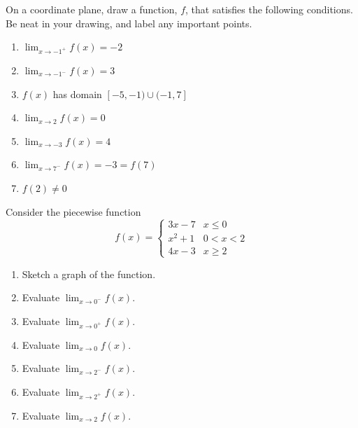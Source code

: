 \documentclass{ximera}
\begin{document}
\begin{exercise}
    On a coordinate plane, draw a function, $f$, that satisfies the following conditions.  Be neat in your drawing, and label any important points.
        \begin{enumerate}
            \item $\displaystyle\lim_{x\rightarrow -1^+}f(x)=-2$
            \item $\displaystyle\lim_{x\rightarrow -1^-} f(x)=3$
            \item $f(x)$ has domain $[-5, -1)\cup(-1,7] $
            \item $\displaystyle\lim_{x\rightarrow 2}f(x)=0$
            \item $\displaystyle\lim_{x\rightarrow -3}f(x)=4$
            \item $\displaystyle\lim_{x\rightarrow 7^-} f(x)=-3=f(7)$
            \item $f(2)\neq 0$
        \end{enumerate}
\end{exercise}

\begin{exercise}   
  Consider the piecewise function 
  \[f(x)=
  \begin{cases}
    3x-7 & x\leq 0\\
    x^2+1 & 0<x<2\\
    4x-3 & x\geq 2
  \end{cases}\]
  \begin{enumerate}
    \item Sketch a graph of the function.
    \item Evaluate $\lim_{x\rightarrow 0^-}f(x)$.
    \item Evaluate $\lim_{x\rightarrow 0^+}f(x)$.
    \item Evaluate $\lim_{x\rightarrow 0}f(x)$.
    \item Evaluate $\lim_{x\rightarrow 2^-}f(x)$.
    \item Evaluate $\lim_{x\rightarrow 2^+}f(x)$.
    \item Evaluate $\lim_{x\rightarrow 2}f(x)$.
  \end{enumerate}
\end{exercise}
\end{document}
